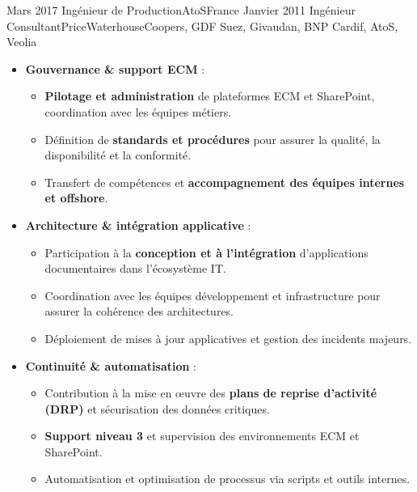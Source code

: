 \begin{experiences}
\emptySeparator

\consultantexperience
    {Mars 2017}       {Ingénieur de Production}{AtoS}{France}
    {Janvier 2011}    {Ingénieur Consultant}{PriceWaterhouseCoopers, GDF Suez, Givaudan, BNP Cardif, AtoS, Veolia} {
        \begin{itemize}[left=0pt,label={},itemsep=0.4em]
        \vspace{0.3em}  %
          \item \textbf{Gouvernance \& support ECM} :
            \begin{itemize}[itemsep=0.2em,topsep=0.2em,parsep=0pt]
              \small
              \item \textbf{Pilotage et administration} de plateformes ECM et SharePoint, coordination avec les équipes métiers.
              \item Définition de \textbf{standards et procédures} pour assurer la qualité, la disponibilité et la conformité.
              \item Transfert de compétences et \textbf{accompagnement des équipes internes et offshore}.
            \end{itemize}

          \item \textbf{Architecture \& intégration applicative} :
            \begin{itemize}[itemsep=0.2em,topsep=0.2em,parsep=0pt]
              \small
              \item Participation à la \textbf{conception et à l’intégration} d’applications documentaires dans l’écosystème IT.
              \item Coordination avec les équipes développement et infrastructure pour assurer la cohérence des architectures.
              \item Déploiement de mises à jour applicatives et gestion des incidents majeurs.
            \end{itemize}

          \item \textbf{Continuité \& automatisation} :
            \begin{itemize}[itemsep=0.2em,topsep=0.2em,parsep=0pt]
              \small
              \item Contribution à la mise en œuvre des \textbf{plans de reprise d’activité (DRP)} et sécurisation des données critiques.
              \item \textbf{Support niveau 3} et supervision des environnements ECM et SharePoint.
              \item Automatisation et optimisation de processus via scripts et outils internes.
            \end{itemize}


\end{itemize}}
\end{experiences}
